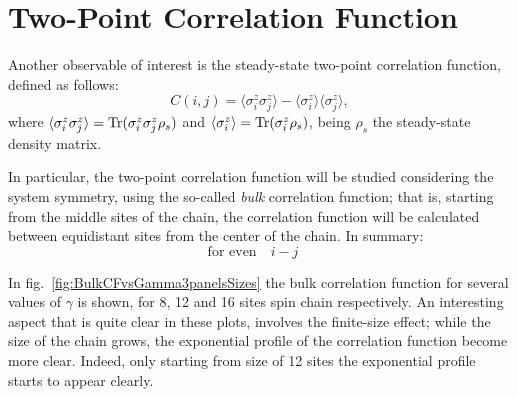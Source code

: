 



\section{Two-Point Correlation Function}
Another observable of interest is the steady-state two-point correlation function, defined as follows:
\begin{equation}
    C(i, j) = \langle \sigma^z_i \sigma^z_j \rangle - \langle \sigma^z_i \rangle \langle \sigma^z_j \rangle,
\end{equation}
where $\langle \sigma^z_i \sigma^z_j \rangle = \operatorname{Tr}(\sigma^z_i \sigma^z_j \rho_{s})$ and $\langle \sigma^z_i \rangle = \operatorname{Tr}(\sigma^z_i \rho_{s})$, being $\rho_{s}$ the steady-state density matrix.

In particular, the two-point correlation function will be studied considering the system symmetry, using the so-called \emph{bulk} correlation function; that is, starting from the middle sites of the chain, the correlation function will be calculated between equidistant sites from the center of the chain. In summary:
\begin{equation*}
    \text{for even} \quad i-j \quad
\end{equation*}

In fig.~\ref{fig:BulkCFvsGamma3panelsSizes} the bulk correlation function for several values of $\gamma$ is shown, for 8, 12 and 16 sites spin chain respectively. An interesting aspect that is quite clear in these plots, involves the finite-size effect; while the size of the chain grows, the exponential profile of the correlation function become more clear. Indeed, only starting from size of 12 sites the exponential profile starts to appear clearly.


